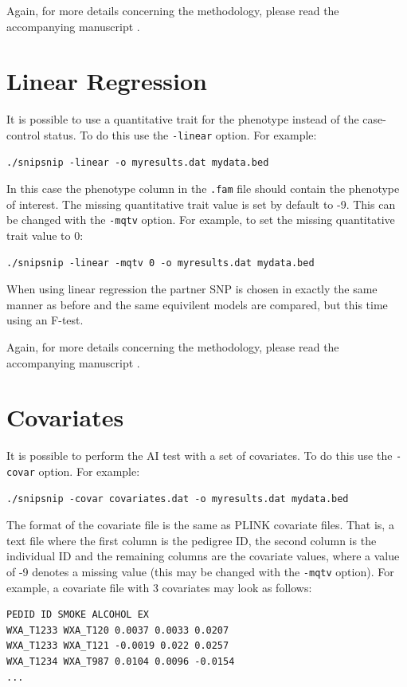 \documentclass[a4paper,12pt]{article}
\newcommand{\code}[1]{{\footnotesize{{\tt #1}}}}
\begin{document}
Again, for more details concerning the methodology, please read the accompanying manuscript \citet{howey:etal:14}. 


\section{Linear Regression}
\label{linear}

It is possible to use a quantitative trait for the phenotype instead of the case-control status. To do this use the \code{-linear} option. For example: 
\begin{verbatim}
./snipsnip -linear -o myresults.dat mydata.bed
\end{verbatim}

In this case the phenotype column in the \code{.fam} file should contain the phenotype of interest. The missing quantitative trait value is set by default to -9. This can be changed with the \code{-mqtv} option. For example, to set the missing quantitative trait value to 0: 
\begin{verbatim}
./snipsnip -linear -mqtv 0 -o myresults.dat mydata.bed
\end{verbatim}

When using linear regression the partner SNP is chosen in exactly the same manner as before and the same equivilent models are compared, but this time using an F-test. 

Again, for more details concerning the methodology, please read the accompanying manuscript \citet{howey:etal:14}. 


\section{Covariates}
\label{covariates}

It is possible to perform the AI test with a set of covariates. To do this use the \code{-covar} option. For example: 
\begin{verbatim}
./snipsnip -covar covariates.dat -o myresults.dat mydata.bed
\end{verbatim}

The format of the covariate file is the same as PLINK covariate files. That is, a text file where the first column is the pedigree ID, the second column is the individual ID and the remaining columns are the covariate values, where a value of -9 denotes a missing value (this may be changed with the \code{-mqtv} option). For example, a covariate file with 3 covariates may look as follows: 
\begin{verbatim}
PEDID ID SMOKE ALCOHOL EX 
WXA_T1233 WXA_T120 0.0037 0.0033 0.0207
WXA_T1233 WXA_T121 -0.0019 0.022 0.0257
WXA_T1234 WXA_T987 0.0104 0.0096 -0.0154
...
\end{verbatim}
\end{document}
